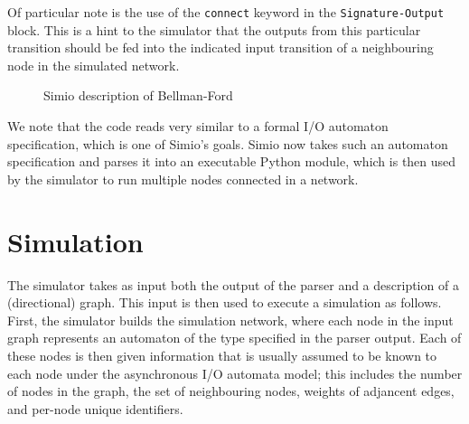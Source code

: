 \documentclass{scrartcl}
\def \kw#1{\texttt{\color{MidnightBlue}#1}}
\def \self {\texttt{\color{Cerulean}self}}
\def \py#1{\texttt{\color{LimeGreen}#1}}
\def \pyval#1{\texttt{\color{Sepia}#1}}
\begin{document}
Of particular note is the use of the \kw{connect} keyword in the
\kw{Signature-Output} block. This is a hint to the simulator that the outputs
from this particular transition should be fed into the indicated input
transition of a neighbouring node in the simulated network.

\begin{figure}
\caption{Simio description of Bellman-Ford}\label{alg:1}
\end{figure}

We note that the code reads very similar to a formal I/O automaton
specification, which is one of Simio's goals. Simio now takes such an automaton
specification and parses it into an executable Python module, which is then
used by the simulator to run multiple nodes connected in a network.

\section{Simulation}\label{sec:sim}

The simulator takes as input both the output of the parser and a description of
a (directional) graph. This input is then used to execute a simulation as
follows. First, the simulator builds the simulation network, where each node in
the input graph represents an automaton of the type specified in the parser
output. Each of these nodes is then given information that is usually assumed
to be known to each node under the asynchronous I/O automata model; this
includes the number of nodes in the graph, the set of neighbouring nodes,
weights of adjancent edges, and per-node unique identifiers.
\end{document}
